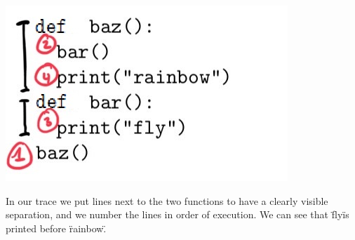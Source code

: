 \includegraphics[width=.4\textwidth]{1-trace-calls.jpeg}

In our trace we put lines next to the two functions to have a clearly visible separation, and we number the lines in order of execution. We can see that \"fly\" is printed before \"rainbow\".
